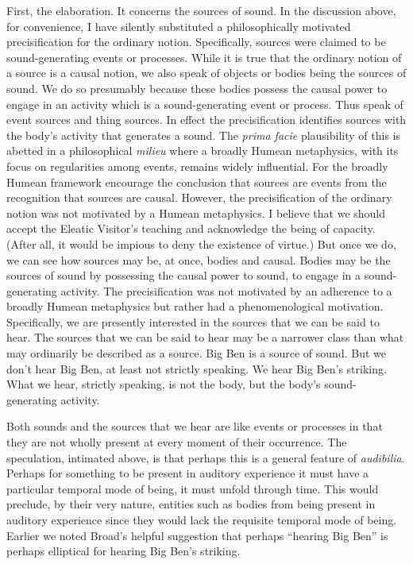 First, the elaboration. It concerns the sources of sound. In the discussion above, for convenience, I have silently substituted a philosophically motivated precisification for the ordinary notion. Specifically, sources were claimed to be sound-generating events or processes. While it is true that the ordinary notion of a source is a causal notion, we also speak of objects or bodies being the sources of sound. We do so presumably because these bodies possess the causal power to engage in an activity which is a sound-generating event or process. Thus \citet{Casati:2013ca} speak of event sources and thing sources. In effect the precisification identifies sources with the body's activity that generates a sound. The \emph{prima facie} plausibility of this is abetted in a philosophical \emph{milieu} where a broadly Humean metaphysics, with its focus on regularities among events, remains widely influential. For the broadly Humean framework encourage the conclusion that sources are events from the recognition that sources are causal. However, the precisification of the ordinary notion was not motivated by a Humean metaphysics. I believe that we should accept the Eleatic Visitor's teaching and acknowledge the being of capacity. (After all, it would be impious to deny the existence of virtue.) But once we do, we can see how sources may be, at once, bodies and causal. Bodies may be the sources of sound by possessing the causal power to sound, to engage in a sound-generating activity. The precisification was not motivated by an adherence to a broadly Humean metaphysics but rather had a phenomenological motivation. Specifically, we are presently interested in the sources that we can be said to hear. The sources that we can be said to hear may be a narrower class than what may ordinarily be described as a source. Big Ben is a source of sound. But we don't hear Big Ben, at least not strictly speaking. We hear Big Ben's striking. What we hear, strictly speaking, is not the body, but the body's sound-generating activity. 

Both sounds and the sources that we hear are like events or processes in that they are not wholly present at every moment of their occurrence. The speculation, intimated above, is that perhaps this is a general feature of \emph{audibilia}. Perhaps for something to be present in auditory experience it must have a particular temporal mode of being, it must unfold through time. This would preclude, by their very nature, entities such as bodies from being present in auditory experience since they would lack the requisite temporal mode of being. Earlier we noted Broad's helpful suggestion that perhaps ``hearing Big Ben'' is  perhaps elliptical for hearing Big Ben's striking.

